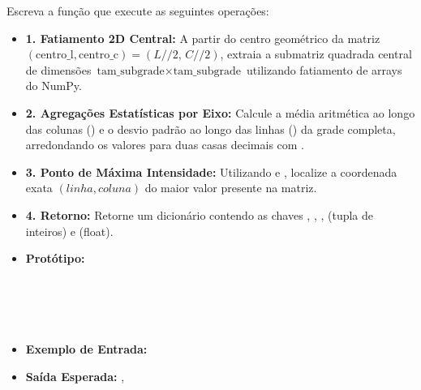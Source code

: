 \begin{enumerate}[label=\textbf{Q\arabic*.}]
Escreva a função  que execute as seguintes operações:
\begin{itemize}[leftmargin=*]
    \item \textbf{1. Fatiamento 2D Central:}\newline
    A partir do centro geométrico da matriz $(\text{centro\_l}, \text{centro\_c}) = (L // 2, \, C // 2)$, extraia a submatriz quadrada central de dimensões $\text{tam\_subgrade} \times \text{tam\_subgrade}$ utilizando fatiamento de arrays do NumPy.
    \item \textbf{2. Agregações Estatísticas por Eixo:}\newline
    Calcule a média aritmética ao longo das colunas () e o desvio padrão ao longo das linhas () da grade completa, arredondando os valores para duas casas decimais com .
    \item \textbf{3. Ponto de Máxima Intensidade:}\newline
    Utilizando  e , localize a coordenada exata $(linha, coluna)$ do maior valor presente na matriz.
    \item \textbf{4. Retorno:}\newline
    Retorne um dicionário contendo as chaves , , ,  (tupla de inteiros) e  (float).
\end{itemize}

\begin{itemize}[leftmargin=*]
    \item \textbf{Protótipo:}\newline
    \\\\\\\\\\
    \item \textbf{Exemplo de Entrada:}\newline
    \newline
    \item \textbf{Saída Esperada:}\newline
    \newline
    , 
\end{itemize}


\end{enumerate}
